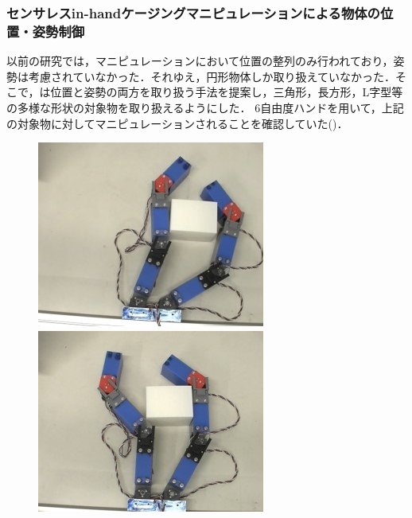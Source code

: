 \documentclass[a4paper,twoside,12pt,papersize, dvipdfmx]{iirthesis}
\begin{document}
\subsubsection{センサレスin-handケージングマニピュレーションによる物体の位置・姿勢制御 \cite{komiyama2021}}
以前の研究\cite{asamura2013}では，マニピュレーションにおいて位置の整列のみ行われており，姿勢は考慮されていなかった．それゆえ，円形物体しか取り扱えていなかった．そこで，\cite{komiyama2021}は位置と姿勢の両方を取り扱う手法を提案し，三角形，長方形，L字型等の多様な形状の対象物を取り扱えるようにした．
6自由度ハンドを用いて，上記の対象物に対してマニピュレーションされることを確認していた()．
\begin{figure}[b]
\begin{minipage}{0.24\hsize}
\centering
\includegraphics[width=\hsize]{fig/Introduction/mani1.jpg}
\subcaption{}
\end{minipage}\hfill
\begin{minipage}{0.24\hsize}
\centering
\includegraphics[width=\hsize]{fig/Introduction/mani2.jpg}

\end{minipage}
\end{figure}
\end{document}

